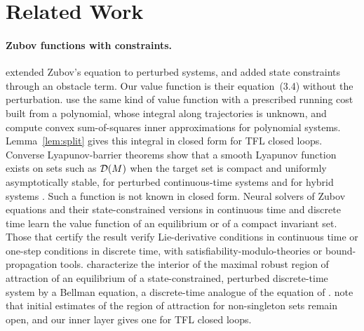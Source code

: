 \section{Related Work}\label{app:related}

\paragraph{Zubov functions with constraints.} \citet{camilli2001} extended Zubov's equation to perturbed systems, and \citet{gruene2015} added state constraints through an obstacle term. Our value function is their equation~(3.4) without the perturbation. \citet{xue2020} use the same kind of value function with a prescribed running cost built from a polynomial, whose integral along trajectories is unknown, and compute convex sum-of-squares inner approximations for polynomial systems. Lemma~\ref{lem:split} gives this integral in closed form for TFL closed loops. Converse Lyapunov-barrier theorems show that a smooth Lyapunov function exists on sets such as $\mathcal D(M)$ when the target set is compact and uniformly asymptotically stable, for perturbed continuous-time systems \citep{meng2022} and for hybrid systems \citep{meng2023}. Such a function is not known in closed form. Neural solvers of Zubov equations \citep{liu2025,liu2024lyznet,kang2023} and their state-constrained versions in continuous time \citep{mengliu2026} and discrete time \citep{serry2025,serry2026} learn the value function of an equilibrium or of a compact invariant set. Those that certify the result verify Lie-derivative conditions in continuous time or one-step conditions in discrete time, with satisfiability-modulo-theories or bound-propagation tools. \citet{xue2020bellman} characterize the interior of the maximal robust region of attraction of an equilibrium of a state-constrained, perturbed discrete-time system by a Bellman equation, a discrete-time analogue of the equation of \citet{gruene2015}. \citet{serry2026} note that initial estimates of the region of attraction for non-singleton sets remain open, and our inner layer gives one for TFL closed loops.

